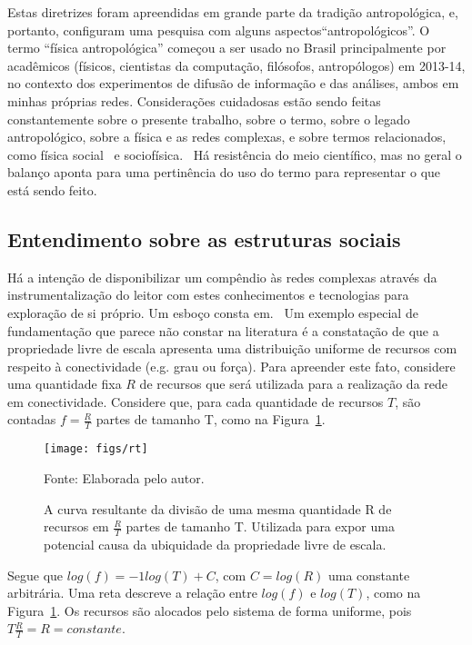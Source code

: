 \documentclass[a4paper,openright,12pt]{report} %
\newcommand{\source}[1]{\caption*{Fonte: {#1}} }
\begin{document}
Estas diretrizes foram apreendidas em grande parte da tradição antropológica,
e, portanto, configuram uma pesquisa com alguns aspectos``antropológicos''.
O termo ``física antropológica'' começou a ser usado no Brasil principalmente por
acadêmicos (físicos, cientistas da computação, filósofos, antropólogos) em 2013-14,
no contexto dos experimentos de difusão de informação e das análises, ambos em minhas próprias redes.
Considerações cuidadosas estão sendo feitas constantemente sobre o presente trabalho, 
sobre o termo, sobre o legado antropológico,
sobre a física e as redes complexas, e sobre termos relacionados, 
como física social~\cite{pentland2} e sociofísica.~\cite{socioF}
Há resistência do meio científico, mas no geral o balanço aponta para uma pertinência do uso do termo
para representar o que está sendo feito.

\subsection{Entendimento sobre as estruturas sociais}\label{sec:com}
Há a intenção de disponibilizar um compêndio às redes complexas
através da instrumentalização do leitor com estes conhecimentos e tecnologias
para exploração de si próprio. Um esboço
consta em.~\cite{gradus}
Um exemplo especial de fundamentação que parece não 
constar na literatura é a constatação de que
a propriedade livre de escala apresenta uma distribuição
uniforme de recursos com respeito à conectividade (e.g. grau ou força).
Para apreender este fato, considere uma quantidade fixa $R$ de recursos
que será utilizada para a realização da rede em conectividade.
Considere que, para cada quantidade de recursos $T$, são contadas $f=\frac{R}{T}$ partes de tamanho T, como na Figura~\ref{fig:1T}.

\begin{figure}[!h]
    \centering
    \caption{ \footnotesize A curva resultante da divisão de uma mesma quantidade
    R de recursos em $\frac{R}{T}$ partes de tamanho T.
        Utilizada para expor uma potencial causa da ubiquidade da
        propriedade livre de escala.}
    \texttt{[image: figs/rt]}
    \source{Elaborada pelo autor.}
    \label{fig:1T}
\end{figure}
\vspace{-.3cm}

Segue que $log(f)=-1 log(T) + C$, com $C=log(R)$ uma constante
arbitrária. Uma reta descreve a relação entre $log(f)$ e 
$log(T)$, como na Figura~\ref{fig:1T}.
Os recursos são alocados pelo sistema de forma uniforme,
pois $T\frac{R}{T}=R=constante$.
\end{document}
